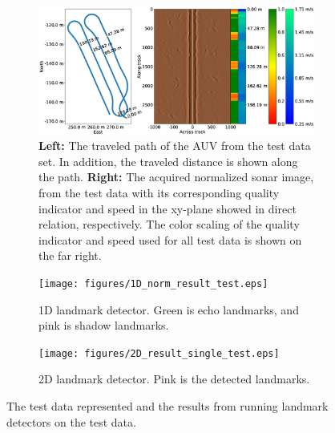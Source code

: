 \begin{figure} [hb] %
     \centering
    \begin{subfigure}[t]{0.87\textwidth}
         \centering
         \includegraphics[trim=0cm 3.4cm 0cm 3.4cm, clip=true, width=\textwidth]{figures/path_sonar_colorbars_test.eps}
         \caption{\textbf{Left:} The traveled path of the AUV from the test data set. In addition, the traveled distance is shown along the path. \textbf{Right:} The acquired normalized sonar image, from the test data with its corresponding quality indicator and speed in the xy-plane showed in direct relation, respectively. The color scaling of the quality indicator and speed used for all test data is shown on the far right.}
         \label{fig:test_data}
     \end{subfigure}
     \hfill
     \begin{subfigure}[b]{0.44\textwidth}
         \centering
         \texttt{[image: figures/1D\_norm\_result\_test.eps]}
         \caption{1D landmark detector. Green is echo landmarks, and pink is shadow landmarks.}
         \label{fig:1D_norm_result_test}
     \end{subfigure}
     \begin{subfigure}[b]{0.44\textwidth}
         \centering
         \texttt{[image: figures/2D\_result\_single\_test.eps]}
         \caption{2D landmark detector. Pink is the detected landmarks.}
         \label{fig:2D_result_single_test}
     \end{subfigure}
        \caption{The test data represented and the results from running landmark detectors on the test data.}
        \label{fig:landmark_detection_test_data}
\end{figure}
